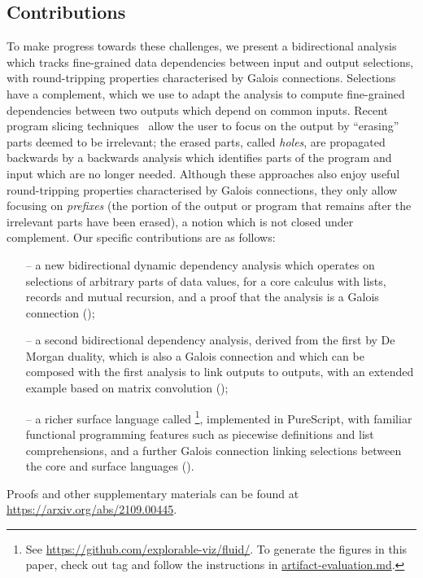 \subsection{Contributions}

To make progress towards these challenges, we present a bidirectional analysis which tracks fine-grained data dependencies between input and output selections, with round-tripping properties characterised by Galois connections. Selections have a complement, which we use to adapt the analysis to compute fine-grained dependencies between two outputs which depend on common inputs. Recent program slicing techniques~\cite{perera12a,perera16d,ricciotti17} allow the user to focus on the output by ``erasing'' parts deemed to be irrelevant; the erased parts, called \emph{holes}, are propagated backwards by a backwards analysis which identifies parts of the program and input which are no longer needed. Although these approaches also enjoy useful round-tripping properties characterised by Galois connections, they only allow focusing on \emph{prefixes} (the portion of the output or program that remains after the irrelevant parts have been erased), a notion which is not closed under complement. Our specific contributions are as follows:

\begin{itemize}
   \item[--] a new bidirectional dynamic dependency analysis which operates on selections of arbitrary parts of data values, for a core calculus with lists, records and mutual recursion, and a proof that the analysis is a Galois connection ();
   \item[--] a second bidirectional dependency analysis, derived from the first by De Morgan duality, which is also a Galois connection and which can be composed with the first analysis to link outputs to outputs, with an extended example based on matrix convolution  ();
   \item[--] a richer surface language called \OurLanguage\footnote{See \url{https://github.com/explorable-viz/fluid/}. To generate the figures in this paper, check out tag  and follow the instructions in \href{https://github.com/explorable-viz/fluid/blob/v0.4.2/artifact-evaluation.md}{artifact-evaluation.md}.}, implemented in PureScript, with familiar functional programming features such as piecewise definitions and list comprehensions, and a further Galois connection linking selections between the core and surface languages ().
\end{itemize}

\noindent Proofs and other supplementary materials can be found at \url{https://arxiv.org/abs/2109.00445}.
